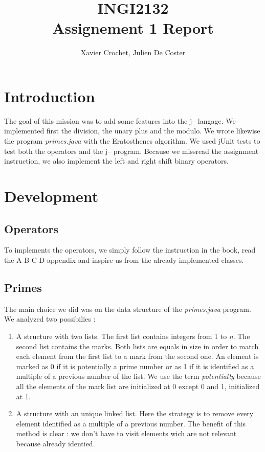\documentclass[10pt,a4paper]{article}
\author{Xavier Crochet, Julien De Coster}
\title{INGI2132 \\ Assignement 1 Report}
\begin{document}
\maketitle

\section{Introduction}
The goal of this mission was to add some features into the j-- langage. We implemented first the division, the unary plus and the modulo. We wrote likewise the program \emph{primes.java} with the Eratosthenes algorithm. We used jUnit tests to test both the operators and the j-- program. Because we missread the assignment instruction, we also implement the left and right shift binary operators. 

\section{Development}
\subsection{Operators}

To implements the operators, we simply follow the instruction in the book, read the A-B-C-D appendix and inspire us from the already implemented classes. 

\subsection{Primes}
The main choice we did was on the data structure of the \emph{primes.java} program. We analyzed two possibilies :

\begin{enumerate}
\item{A structure with two lists. The first list contains integers from 1 to \emph{n}. The second list contains the marks. Both lists are equals in size in order to match each element from the first list to a mark from the second one. An element is marked as 0 if it is potentially a prime number or as 1 if it is identified as a multiple of a previous number of the list. We use the term \emph{potentially} because all the elements of the mark list are initialized at 0 except 0 and 1, initialized at 1.}

\item {A structure with an unique linked list. Here the strategy is to remove every element identified as a multiple of a previous number. The benefit of this method is clear : we don't have to visit elements wich are not relevant because already identied.}
\end{enumerate}
\end{document}
